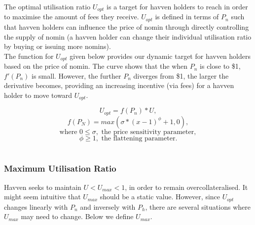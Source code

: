 \noindent The optimal utilisation ratio $U_{opt}$ is a target for havven holders to reach in order to maximise the amount of fees they receive. $U_{opt}$ is defined in terms of $P_n$ such that havven holders can influence the price of nomin through directly controlling the supply of nomin (a havven holder can change their individual utilisation ratio by buying or issuing more nomins). \\
 
\noindent The function for $U_{opt}$ given below provides our dynamic target for havven holders based on the price of nomin. The curve shows that the when $P_n$ is close to \$1, $ f'(P_n) $ is small. However, the further $P_n$ diverges from \$1, the larger the derivative becomes, providing an increasing incentive (via fees) for a havven holder to move toward $U_{opt}$.

$$ U_{opt} = f(P_n) * U,$$
$$ f(P_N) = max(\sigma * (x - 1)^{\phi} + 1, 0), $$
$$\text{where } 0 \leq \sigma, \text{ the price sensitivity parameter}, $$
$$\phi \geq 1, \text{ the flattening parameter}. $$ \\

\begin{center}
\end{center}

\newpage

\subsubsection{Maximum Utilisation Ratio}

\noindent Havven seeks to maintain $U < U_{max} < 1$, in order to remain overcollateralised. It might seem intuitive that $U_{max}$ should be a static value. However, since $U_{opt}$ changes linearly with $P_n$ and inversely with $P_h$, there are several situations where $U_{max}$ may need to change. Below we define $U_{max}$. \\

